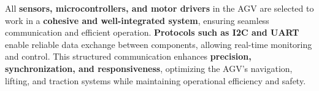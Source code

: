 \documentclass[../../main]{subfiles}
\begin{document}
All \textbf{sensors, microcontrollers, and motor drivers} in the AGV 
are selected to work in a \textbf{cohesive and well-integrated system}, 
ensuring seamless communication and efficient operation. 
\textbf{Protocols such as I2C and UART} enable reliable data exchange 
between components, allowing real-time monitoring and control. 
This structured communication enhances \textbf{precision, synchronization, 
and responsiveness}, optimizing the AGV’s navigation, lifting, and 
traction systems while maintaining operational efficiency and safety.
    
\end{document}
